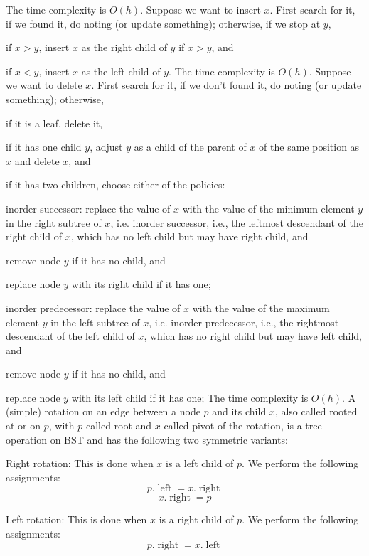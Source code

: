 \documentclass[a4paper,12pt]{article}
\begin{document}
The time complexity is $O(h)$.
Suppose we want to insert $x$. First search for it, if we found it, do noting (or update something); otherwise, if we stop at $y$,
\bit
\item if $x>y$, insert $x$ as the right child of $y$ if $x>y$, and
\item if $x<y$, insert $x$ as the left child of $y$.
\eit
The time complexity is $O(h)$.
Suppose we want to delete $x$. First search for it, if we don't found it, do noting (or update something); otherwise,
\bit
\item if it is a leaf, delete it,
\item if it has one child $y$, adjust $y$ as a child of the parent of $x$ of the same position as $x$ and delete $x$, and
\item if it has two children, choose either of the policies:
\bit
\item inorder successor: replace the value of $x$ with the value of the minimum element $y$ in the right subtree of $x$, i.e. inorder successor, i.e., the leftmost descendant of the right child of $x$, which has no left child but may have right child, and
\bit
\item remove node $y$ if it has no child, and
\item replace node $y$ with its right child if it has one;
\eit
\item inorder predecessor: replace the value of $x$ with the value of the maximum element $y$ in the left subtree of $x$, i.e. inorder predecessor, i.e., the rightmost descendant of the left child of $x$, which has no right child but may have left child, and
\bit
\item remove node $y$ if it has no child, and
\item replace node $y$ with its left child if it has one;
\eit
\eit
\eit
The time complexity is $O(h)$.
A (simple) rotation on an edge between a node $p$ and its child $x$, also called rooted at or on $p$, with $p$ called root and $x$ called pivot of the rotation, is a tree operation on BST and has the following two symmetric variants:
\bit
\item Right rotation: This is done when $x$ is a left child of $p$. We perform the following assignments:
\[p.\operatorname{left}=x.\operatorname{right}\]
\[x.\operatorname{right}=p\]
\item Left rotation: This is done when $x$ is a right child of $p$. We perform the following assignments:
\[p.\operatorname{right}=x.\operatorname{left}\]
\end{document}
